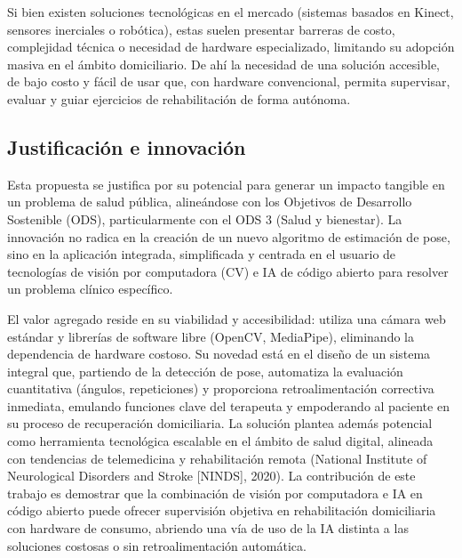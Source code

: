 \documentclass[11pt,a4paper]{article}
\begin{document}
Si bien existen soluciones tecnológicas en el mercado (sistemas basados en Kinect, sensores inerciales o robótica), estas suelen presentar barreras de costo, complejidad técnica o necesidad de hardware especializado, limitando su adopción masiva en el ámbito domiciliario. De ahí la necesidad de una solución accesible, de bajo costo y fácil de usar que, con hardware convencional, permita supervisar, evaluar y guiar ejercicios de rehabilitación de forma autónoma.

\subsection{Justificación e innovación}
Esta propuesta se justifica por su potencial para generar un impacto tangible en un problema de salud pública, alineándose con los Objetivos de Desarrollo Sostenible (ODS), particularmente con el ODS 3 (Salud y bienestar). La innovación no radica en la creación de un nuevo algoritmo de estimación de pose, sino en la aplicación integrada, simplificada y centrada en el usuario de tecnologías de visión por computadora (CV) e IA de código abierto para resolver un problema clínico específico.

El valor agregado reside en su viabilidad y accesibilidad: utiliza una cámara web estándar y librerías de software libre (OpenCV, MediaPipe), eliminando la dependencia de hardware costoso. Su novedad está en el diseño de un sistema integral que, partiendo de la detección de pose, automatiza la evaluación cuantitativa (ángulos, repeticiones) y proporciona retroalimentación correctiva inmediata, emulando funciones clave del terapeuta y empoderando al paciente en su proceso de recuperación domiciliaria. La solución plantea además potencial como herramienta tecnológica escalable en el ámbito de salud digital, alineada con tendencias de telemedicina y rehabilitación remota (National Institute of Neurological Disorders and Stroke [NINDS], 2020). La contribución de este trabajo es demostrar que la combinación de visión por computadora e IA en código abierto puede ofrecer supervisión objetiva en rehabilitación domiciliaria con hardware de consumo, abriendo una vía de uso de la IA distinta a las soluciones costosas o sin retroalimentación automática.
\end{document}
